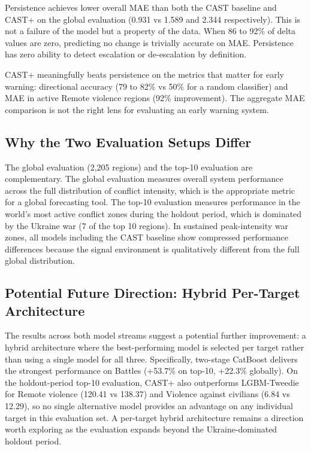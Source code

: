 \documentclass[12pt,a4paper]{article}
\begin{document}
Persistence achieves lower overall MAE than both the CAST baseline
and CAST+ on the global evaluation (0.931 vs 1.589 and 2.344
respectively). This is not a failure of the model but a property of
the data. When 86 to 92\% of delta values are zero, predicting no
change is trivially accurate on MAE. Persistence has zero ability to
detect escalation or de-escalation by definition.

CAST+ meaningfully beats persistence on the metrics that matter for
early warning: directional accuracy (79 to 82\% vs 50\% for a random
classifier) and MAE in active Remote violence regions (92\%
improvement). The aggregate MAE comparison is not the right lens for
evaluating an early warning system.

\subsection{Why the Two Evaluation Setups Differ}

The global evaluation (2,205 regions) and the top-10 evaluation are
complementary. The global evaluation measures overall system
performance across the full distribution of conflict intensity, which
is the appropriate metric for a global forecasting tool. The top-10
evaluation measures performance in the world's most active conflict
zones during the holdout period, which is dominated by the Ukraine
war (7 of the top 10 regions). In sustained peak-intensity war zones,
all models including the CAST baseline show compressed performance
differences because the signal environment is qualitatively different
from the full global distribution.

\subsection{Potential Future Direction: Hybrid Per-Target Architecture}

The results across both model streams suggest a potential further
improvement: a hybrid architecture where the best-performing model
is selected per target rather than using a single model for all three.
Specifically, two-stage CatBoost delivers the strongest performance
on Battles (+53.7\% on top-10, +22.3\% globally). On the
holdout-period top-10 evaluation, CAST+ also outperforms
LGBM-Tweedie for Remote violence (120.41 vs 138.37) and Violence
against civilians (6.84 vs 12.29), so no single alternative model
provides an advantage on any individual target in this evaluation
set. A per-target hybrid architecture remains a direction worth
exploring as the evaluation expands beyond the
Ukraine-dominated holdout period.
\end{document}
